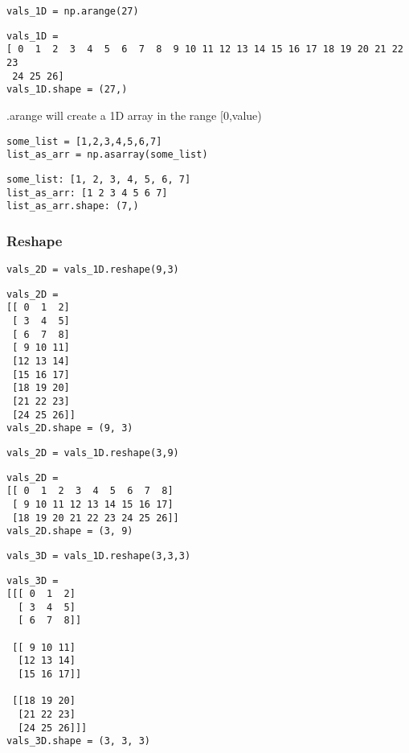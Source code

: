 \begin{lstlisting}[style=pyInStyle]
vals_1D = np.arange(27)
\end{lstlisting}
\begin{lstlisting}[style=pyOutStyle]
vals_1D = 
[ 0  1  2  3  4  5  6  7  8  9 10 11 12 13 14 15 16 17 18 19 20 21 22 23
 24 25 26]
vals_1D.shape = (27,)
\end{lstlisting}
\begin{markdown}
.arange will create a 1D array in the range [0,value)
\end{markdown}


\begin{lstlisting}[style=pyInStyle]
some_list = [1,2,3,4,5,6,7]
list_as_arr = np.asarray(some_list)
\end{lstlisting}
\begin{lstlisting}[style=pyOutStyle]
some_list: [1, 2, 3, 4, 5, 6, 7]
list_as_arr: [1 2 3 4 5 6 7]
list_as_arr.shape: (7,)
\end{lstlisting}


\subsubsection{Reshape}

\begin{lstlisting}[style=pyInStyle]
vals_2D = vals_1D.reshape(9,3)
\end{lstlisting}
\begin{lstlisting}[style=pyOutStyle]
vals_2D = 
[[ 0  1  2]
 [ 3  4  5]
 [ 6  7  8]
 [ 9 10 11]
 [12 13 14]
 [15 16 17]
 [18 19 20]
 [21 22 23]
 [24 25 26]]
vals_2D.shape = (9, 3)
\end{lstlisting}


\begin{lstlisting}[style=pyInStyle]
vals_2D = vals_1D.reshape(3,9)
\end{lstlisting}
\begin{lstlisting}[style=pyOutStyle]
vals_2D = 
[[ 0  1  2  3  4  5  6  7  8]
 [ 9 10 11 12 13 14 15 16 17]
 [18 19 20 21 22 23 24 25 26]]
vals_2D.shape = (3, 9)
\end{lstlisting}


\begin{lstlisting}[style=pyInStyle]
vals_3D = vals_1D.reshape(3,3,3)
\end{lstlisting}
\begin{lstlisting}[style=pyOutStyle]
vals_3D = 
[[[ 0  1  2]
  [ 3  4  5]
  [ 6  7  8]]

 [[ 9 10 11]
  [12 13 14]
  [15 16 17]]

 [[18 19 20]
  [21 22 23]
  [24 25 26]]]
vals_3D.shape = (3, 3, 3)
\end{lstlisting}


